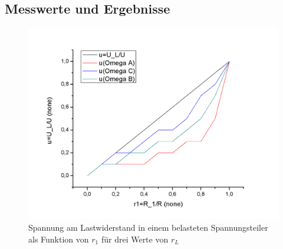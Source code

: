 \documentclass[12pt,a4paper]{article}
\begin{document}
\subsection{Messwerte und Ergebnisse}
\begin{figure}[H]
	\centering
	\includegraphics[scale=0.5]{./figure/spannungsteiler_u_r1.png}
	\caption{Spannung am Lastwiderstand in einem belasteten Spannungsteiler als Funktion von $r_1$ für drei Werte von $r_L$}
	\label{fig:spannungsteiler_lastwiderstaende}
\end{figure}
\end{document}
